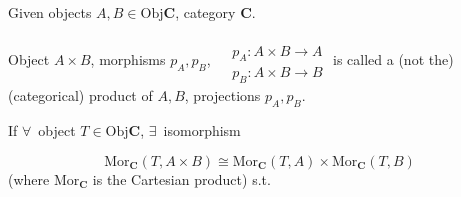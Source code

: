 \begin{definition}
	Given objects $A, B \in \text{Obj}\mathbf{C}$, category $\mathbf{C}$. 
	
	Object $A\times B$, morphisms $p_A, p_B$, $\begin{aligned} & \quad \\ 
		& p_A : A \times B \to A \\ 
		& p_B : A\times B \to B
		\end{aligned}$ is called a (not the) (categorical) product of $A, B$, projections $p_A, p_B$. 
		
		If $\forall \, $ object $T\in \text{Obj}\mathbf{C}$, $\exists \, $ isomorphism

		\begin{equation}
			\text{Mor}_{\mathbf{C}}(T, A \times B)  \cong \text{Mor}_{\mathbf{C}}(T, A) \times \text{Mor}_{\mathbf{C}}(T,B)		
		\end{equation}
(where $\text{Mor}_{\mathbf{C}}$ is the Cartesian product) s.t.


\end{definition}

